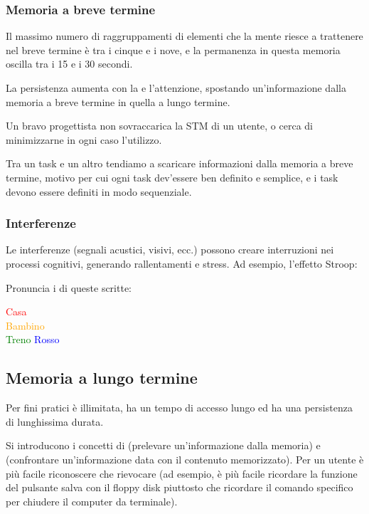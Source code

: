 \subsubsection{Memoria a breve termine}
\label{chap:memoria_breve_termine}

Il massimo numero di raggruppamenti di elementi che la mente riesce a trattenere nel breve termine è tra i cinque e i nove, e la permanenza in questa memoria oscilla tra i 15 e i 30 secondi.

La persistenza aumenta con la  e l'attenzione, spostando un'informazione dalla memoria a breve termine in quella a lungo termine.

Un bravo progettista non sovraccarica la STM di un utente, o cerca di minimizzarne in ogni caso l'utilizzo.

Tra un task e un altro tendiamo a scaricare informazioni dalla memoria a breve termine, motivo per cui ogni task dev'essere ben definito e semplice, e i task devono essere definiti in modo sequenziale.

\subsubsection{Interferenze}

Le interferenze (segnali acustici, visivi, ecc.) possono creare interruzioni nei processi cognitivi, generando rallentamenti e stress. Ad esempio, l'effetto Stroop:

\begin{center}
    Pronuncia i  di queste scritte:

    \textcolor{red}{Casa}\\
    \textcolor{orange}{Bambino}\\
    \textcolor{green}{Treno}
    \textcolor{blue}{Rosso}\\
\end{center}

\subsection{Memoria a lungo termine}
\label{chap:memoria_lungo_termine}

Per fini pratici  è illimitata, ha un tempo di accesso lungo ed ha una persistenza di lunghissima durata.

Si introducono i concetti di  (prelevare un'informazione dalla memoria) e  (confrontare un'informazione data con il contenuto memorizzato). Per un utente è più facile riconoscere che rievocare (ad esempio, è più facile ricordare la funzione del pulsante salva con il floppy disk piuttosto che ricordare il comando specifico per chiudere il computer da terminale).

